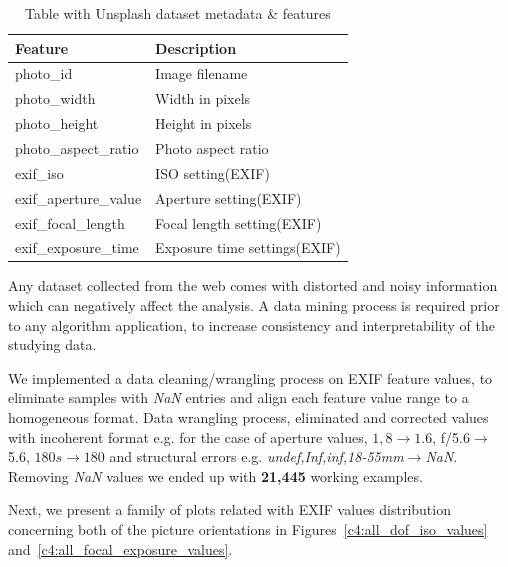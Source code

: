\begin{table}[ht!]
\centering
\begin{tabular}{|l|l|}
\hline
 \textbf{Feature} & \textbf{Description}  \\ \hline
 photo\_id  & Image filename  \\ \hline
 photo\_width & Width in pixels \\ \hline
 photo\_height & Height in pixels  \\ \hline
 photo\_aspect\_ratio & Photo aspect ratio \\ \hline
 exif\_iso & ISO setting(EXIF) \\ \hline
 exif\_aperture\_value & Aperture setting(EXIF) \\ \hline
 exif\_focal\_length & Focal length setting(EXIF) \\ \hline
 exif\_exposure\_time & Exposure time settings(EXIF)  \\ \hline
\end{tabular}
\caption{Table with Unsplash dataset metadata \& features}
\label{c4:unsplash_feature_table}
\end{table}

Any dataset collected from the web comes with distorted and noisy information which can negatively affect the analysis. 
A data mining process is required prior to any algorithm application, to increase consistency and interpretability of the studying data.

We implemented a data cleaning/wrangling process on EXIF feature values, to eliminate samples with \textit{NaN} entries and align each feature value range to a homogeneous format.
Data wrangling process, eliminated and corrected values with incoherent format e.g. for the case of aperture values, $1,8\rightarrow1.6$, f/5.6$\rightarrow$5.6, $180s \rightarrow 180$ and structural errors e.g. \textit{undef,Inf,inf,18-55mm}$\rightarrow$\textit{NaN}. Removing \textit{NaN} values we ended up with \textbf{21,445} working examples.

Next, we present a family of plots related with EXIF values distribution concerning both of the picture orientations in Figures~\ref{c4:all_dof_iso_values} and~\ref{c4:all_focal_exposure_values}.


